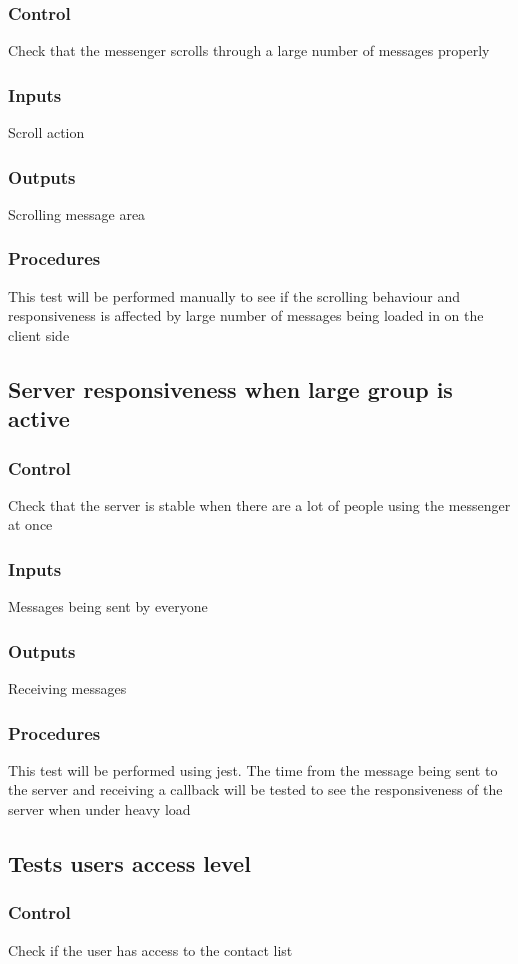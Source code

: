 \documentclass[12pt, titlepage]{article}
\begin{document}
\subsubsection{Control}
Check that the messenger scrolls through a large number of messages properly
\subsubsection{Inputs}
Scroll action
\subsubsection{Outputs}
Scrolling message area
\subsubsection{Procedures}
This test will be performed manually to see if the scrolling behaviour and responsiveness is affected by large number of messages being loaded in on the client side
\subsection{Server responsiveness when large group is active}
\subsubsection{Control}
Check that the server is stable when there are a lot of people using the messenger at once
\subsubsection{Inputs}
Messages being sent by everyone
\subsubsection{Outputs}
Receiving messages
\subsubsection{Procedures}
This test will be performed using jest. The time from the message being sent to the server and receiving a callback will be tested to see the responsiveness of the server when under heavy load
\subsection{Tests users access level}
\subsubsection{Control}
Check if the user has access to the contact list
\end{document}
